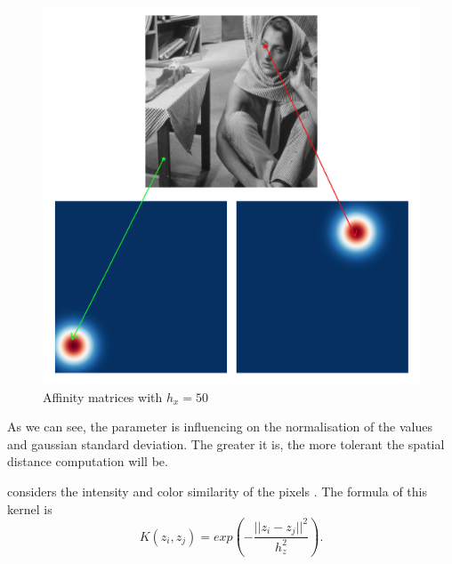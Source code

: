 \begin{description}[align=left]
  \begin{figure}[H]
      \centering
      \includegraphics[width=\textwidth]{img/spatialAffinitySigma50.png}
      \caption{Affinity matrices with \(h_x = 50\)}
  \end{figure}

  As we can see, the parameter is influencing on the normalisation of the values and gaussian standard deviation.
  The greater it is, the more tolerant the spatial distance computation will be.

 \item [Photometric Gaussian Kernel] considers the intensity and color similarity of the pixels \cite{siam_slides_2016}.
  The formula of this kernel is
  \[K(z_i, z_j) = exp(-\frac{||z_i - z_j||^2}{h_z^2}).\]


\end{description}
